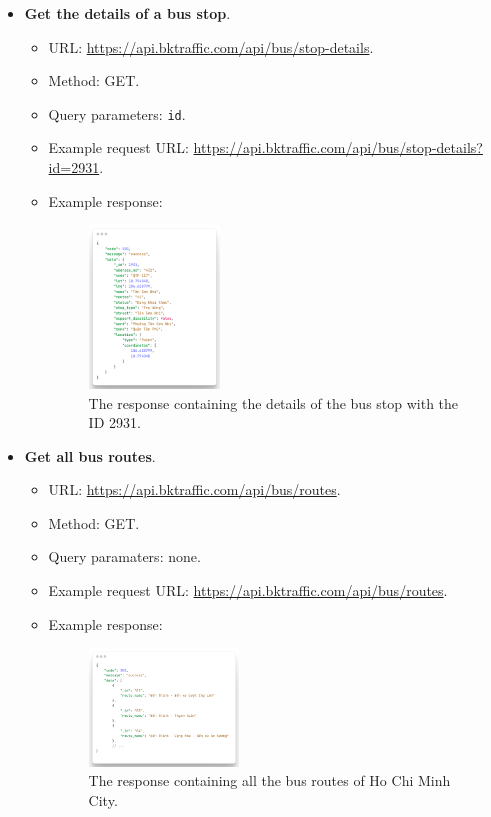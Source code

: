 \begin{itemize}
    \item \textbf{Get the details of a bus stop}.
    \begin{itemize}
        \item URL: \url{https://api.bktraffic.com/api/bus/stop-details}.
        \item Method: GET.
        \item Query parameters: \lstinline{id}.
        \item Example request URL: \url{https://api.bktraffic.com/api/bus/stop-details?id=2931}.
        \item Example response:
        \begin{figure}[H]
            \centering
            \includegraphics[width=0.35\textwidth]{assets/images/Implementation/stop_detail_response.png}
            \caption{The response containing the details of the bus stop with the ID 2931.}
            \label{fig:stop_detail_response}
        \end{figure}
    \end{itemize}

    \item \textbf{Get all bus routes}.
    \begin{itemize}
        \item URL: \url{https://api.bktraffic.com/api/bus/routes}.
        \item Method: GET.
        \item Query paramaters: none.
        \item Example request URL: \url{https://api.bktraffic.com/api/bus/routes}.
        \item Example response:
        \begin{figure}[H]
            \centering
            \includegraphics[width=0.4\textwidth]{assets/images/Implementation/all_routes_response.png}
            \caption{The response containing all the bus routes of Ho Chi Minh City.}
            \label{fig:all_routes_response}
        \end{figure}
    \end{itemize}


\end{itemize}
